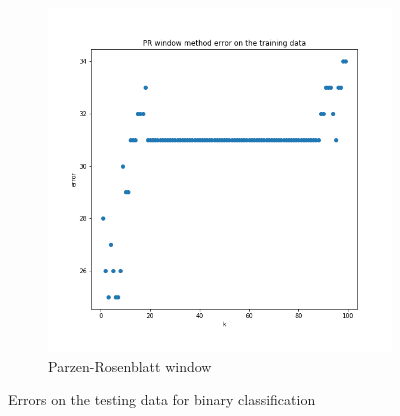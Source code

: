\documentclass{article}
\begin{document}
\begin{figure}[t]
\begin{subfigure}[b]{0.5\textwidth}
        \includegraphics[width=\linewidth]{pr_bin}
        \caption{Parzen-Rosenblatt window}
    \end{subfigure}
    \caption{Errors on the testing data for binary classification}
\end{figure}
\end{document}
